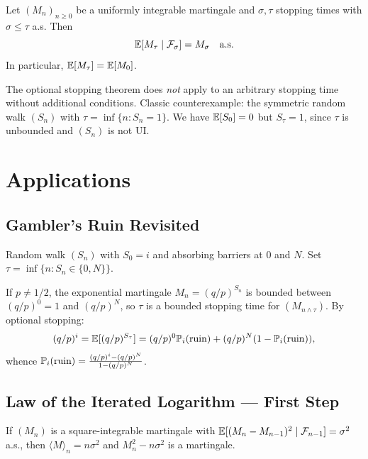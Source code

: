 \begin{theorem}
\label{thm:ost_general}
Let $(M_n)_{n \geq 0}$ be a uniformly integrable martingale and $\sigma, \tau$
stopping times with $\sigma \leq \tau$ a.s. Then
\[
  \mathbb{E}[M_{\tau} \mid \mathcal{F}_{\sigma}] = M_{\sigma} \quad \text{a.s.}
\]
In particular, $\mathbb{E}[M_{\tau}] = \mathbb{E}[M_0]$.
\end{theorem}

\begin{warning}[title=\textbf{Conditions for Optional Stopping}]
The optional stopping theorem does \emph{not} apply to an arbitrary stopping
time without additional conditions. Classic counterexample: the symmetric random
walk $(S_n)$ with $\tau = \inf\{n : S_n = 1\}$. We have $\mathbb{E}[S_0] = 0$ but
$S_{\tau} = 1$, since $\tau$ is unbounded and $(S_n)$ is not UI.
\end{warning}

\section{Applications}

\subsection{Gambler's Ruin Revisited}

\begin{example}
Random walk $(S_n)$ with $S_0 = i$ and absorbing barriers at $0$ and $N$.
Set $\tau = \inf\{n : S_n \in \{0, N\}\}$.

If $p \neq 1/2$, the exponential martingale $M_n = (q/p)^{S_n}$ is bounded
between $(q/p)^0 = 1$ and $(q/p)^N$, so $\tau$ is a bounded stopping time for
$(M_{n \wedge \tau})$. By optional stopping:
\[
  (q/p)^i = \mathbb{E}[(q/p)^{S_\tau}] = (q/p)^0 \mathbb{P}_i(\text{ruin})
  + (q/p)^N (1 - \mathbb{P}_i(\text{ruin})),
\]
whence $\mathbb{P}_i(\text{ruin}) = \frac{(q/p)^i - (q/p)^N}{1 - (q/p)^N}$.
\end{example}

\subsection{Law of the Iterated Logarithm --- First Step}

\begin{proposition}
If $(M_n)$ is a square-integrable martingale with
$\mathbb{E}[(M_n - M_{n-1})^2 \mid \mathcal{F}_{n-1}] = \sigma^2$ a.s., then
$\langle M \rangle_n = n\sigma^2$ and $M_n^2 - n\sigma^2$ is a martingale.
\end{proposition}

